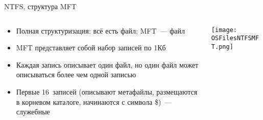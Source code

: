 \documentclass[aspectratio=169,14pt]{beamer}
\begin{document}
\begin{frame}{NTFS, структура MFT}
    \begin{columns}
        \begin{column}{0.65\textwidth}
            \begin{spacing}{0.8}
            \begin{footnotesize}
                \begin{itemize}
                    \item Полная структуризация: всё есть файл; MFT~--- файл
                    \item MFT представляет собой набор записей по 1Кб
                    \item Каждая запись описывает один файл, но один файл может
                    описываться более чем одной записью
                    \item Первые 16~записей (описывают метафайлы, размещаются
                    в корневом каталоге, начинаются с символа \$)~--- служебные
                    \begin{itemize}
                    \end{itemize}
                \end{itemize}
            \end{footnotesize}
            \end{spacing}
        \end{column}
        \begin{column}{0.35\textwidth}
            \texttt{[image: OSFilesNTFSMFT.png]}
        \end{column}
    \end{columns}
\end{frame}
\end{document}
